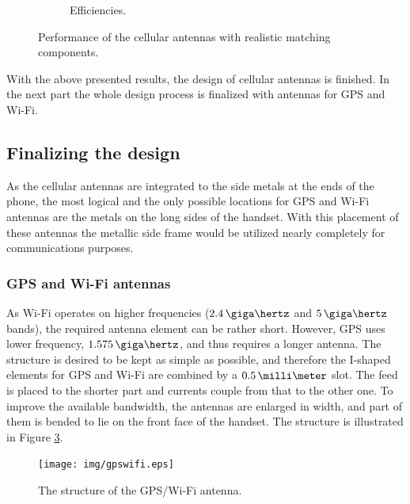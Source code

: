 \begin{figure}[H]
\begin{subfigure}[b]{0.49\textwidth}
        \caption{Efficiencies.}
        \label{fig:div_eff_real}
    \end{subfigure}
    \caption{Performance of the cellular antennas with realistic matching components.}
    \label{fig:div_real}
\end{figure}

With the above presented results, the design of cellular antennas is finished. In the next part the whole design process is finalized with antennas for GPS and Wi-Fi.

\subsection{Finalizing the design}
\label{sec:sim_final}

As the cellular antennas are integrated to the side metals at the ends of the phone, the most logical and the only possible locations for GPS and Wi-Fi antennas are the metals on the long sides of the handset. With this placement of these antennas the metallic side frame would be utilized nearly completely for communications purposes.

\vspace{-8pt}
\subsubsection{GPS and Wi-Fi antennas}
\label{sec:gpswifi}
\vspace{-2pt}
As Wi-Fi operates on higher frequencies ($2.4\,\giga\hertz$ and $5\,\giga\hertz$ bands), the required antenna element can be rather short. However, GPS uses lower frequency, $1.575\,\giga\hertz$, and thus requires a longer antenna. The structure is desired to be kept as simple as possible, and therefore the I-shaped elements for GPS and Wi-Fi are combined by a $0.5\,\milli\meter$ slot. The feed is placed to the shorter part and currents couple from that to the other one. To improve the available bandwidth, the antennas are enlarged in width, and part of them is bended to lie on the front face of the handset. The structure is illustrated in Figure \ref{fig:gps_struct}.
\begin{figure}[H]
    \centering
    \vspace{-10pt}
    \texttt{[image: img/gpswifi.eps]}
    \caption{The structure of the GPS/Wi-Fi antenna.}
    \label{fig:gps_struct}
    \vspace{-7pt}
\end{figure}

